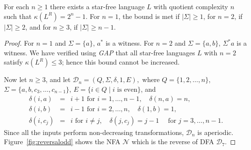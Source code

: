 \documentclass{llncs}
\renewcommand{\le}{\leqslant}
\renewcommand{\ge}{\geqslant}
\newcommand{\Sig}{\Sigma}
\newcommand{\cD}{{\mathcal D}}
\newcommand{\cN}{{\mathcal N}}
\begin{document}
\begin{theorem}
\label{thm:reversal}
For each $n\ge 1$ there exists a star-free language $L$ with quotient complexity $n$ such that $\kappa(L^R)=2^n-1$.
For $n=1$, the bound is met if $|\Sig|\ge 1$,  for $n=2$, if $|\Sig|\ge 2$, and for $n\ge 3$, if $|\Sig|\ge n-1$.
\end{theorem}
\begin{proof}
For $n=1$ and $\Sig=\{a\}$, $a^*$ is a witness. 
For $n=2$ and $\Sig=\{a,b\}$, $\Sig^*a$ is a witness. 
We have verified using \emph{GAP} that all star-free languages $L$ with $n=2$ 
satisfy $\kappa(L^R)\le 3$; hence this bound cannot be increased.

Now let $n\ge 3$, and let 
$\cD_n=(Q,\Sig,\delta,1, E),$
 where 
$Q=\{1,2,\ldots, n\}$, $\Sig=\{a,b,c_3,\ldots,c_{n-1}\}$,  $E=  \{i\in Q\mid i \text{ is even}\}$, and 
\begin{eqnarray*}
\delta(i,a)&=&{i+1} \text{ for } i=1,\ldots,n-1,\quad  \delta(n,a)=n,\\
\delta(i,b)&=&i-1 \text{ for } i=2,\ldots,n,\quad  \delta(1,b)=1,\\
\delta(i,c_j)&=&i \text{ for } i\not=j, \quad \delta(j,c_j)=j-1 \quad \text{ for } j=3,\ldots,n-1.
\end{eqnarray*}
Since all the inputs perform non-decreasing transformations, $\cD_n$ is 
aperiodic. 
Figure~\ref{fig:reversalodd} shows the NFA $\cN$ which is the reverse of  DFA $\cD_7$.



\end{proof}
\end{document}
